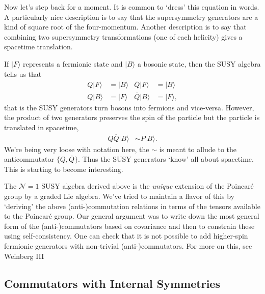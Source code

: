 \documentclass[12pt, oneside]{report}    %
\begin{document}
Now let's step back for a moment. It is common to `dress' this equation in words. A particularly nice description is to say that the supersymmetry generators are a kind of square root of the four-momentum. Another description is to say that combining two supersymmetry transformations (one of each helicity) gives a spacetime translation.

If $|F \rangle$ represents a fermionic state and $|B\rangle$ a bosonic state, then the SUSY algebra tells us that
\begin{align}
    Q|F\rangle &= |B\rangle & \overline Q|F\rangle &= |B\rangle\\
    Q|B\rangle &= |F\rangle & \overline Q|B\rangle &= |F\rangle,
\end{align}
that is the SUSY generators turn bosons into fermions and vice-versa. However, the product of two generators preserves the spin of the particle but the particle is translated in spacetime,
\begin{align}
    Q\overline Q|B\rangle &\sim P|B\rangle.
\end{align}
We're being very loose with notation here, the $\sim$ is meant to allude to the anticommutator $\{Q,\overline Q\}$. Thus the SUSY generators `know' all about spacetime. This is starting to become interesting.

\begin{example}[On the uniqueness of $\mathcal N=1$ SUSY.] The $\mathcal N=1$ SUSY algebra derived above is the \textit{unique} extension of the Poincar\'e group by a graded Lie algebra. We've tried to maintain a flavor of this by `deriving' the above (anti-)commutation relations in terms of the tensors available to the Poincar\'e group. Our general argument was to write down the most general form of the (anti-)commutators based on covariance and then to constrain these using self-consistency. One can check that it is not possible to add higher-spin fermionic generators with non-trivial (anti-)commutators. For more on this, see Weinberg III
\end{example}




\subsection{Commutators with Internal Symmetries}
\end{document}
